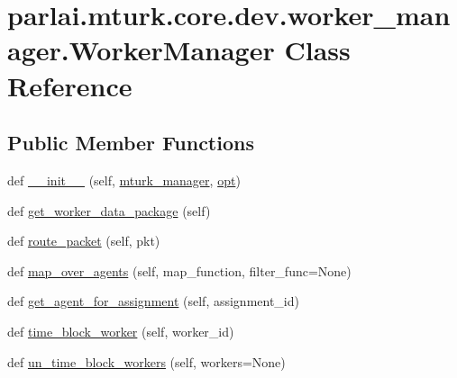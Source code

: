 \hypertarget{classparlai_1_1mturk_1_1core_1_1dev_1_1worker__manager_1_1WorkerManager}{}\section{parlai.\+mturk.\+core.\+dev.\+worker\+\_\+manager.\+Worker\+Manager Class Reference}
\label{classparlai_1_1mturk_1_1core_1_1dev_1_1worker__manager_1_1WorkerManager}
\subsection*{Public Member Functions}
\begin{DoxyCompactItemize}
\item 
def \hyperlink{classparlai_1_1mturk_1_1core_1_1dev_1_1worker__manager_1_1WorkerManager_a491b1e7913bf88ebec78578810cd5bd7}{\+\_\+\+\_\+init\+\_\+\+\_\+} (self, \hyperlink{classparlai_1_1mturk_1_1core_1_1dev_1_1worker__manager_1_1WorkerManager_ac998c8103c199cec59f152128f6b876c}{mturk\+\_\+manager}, \hyperlink{classparlai_1_1mturk_1_1core_1_1dev_1_1worker__manager_1_1WorkerManager_adb7992844dfa581014469721c7b6ebd8}{opt})
\item 
def \hyperlink{classparlai_1_1mturk_1_1core_1_1dev_1_1worker__manager_1_1WorkerManager_a25fea0a63f8cb6ba522162e7e219e945}{get\+\_\+worker\+\_\+data\+\_\+package} (self)
\item 
def \hyperlink{classparlai_1_1mturk_1_1core_1_1dev_1_1worker__manager_1_1WorkerManager_a64541274656cb7cc6890da1625c0bb2b}{route\+\_\+packet} (self, pkt)
\item 
def \hyperlink{classparlai_1_1mturk_1_1core_1_1dev_1_1worker__manager_1_1WorkerManager_ae36a4ae10235fed3001cbc9d1b15b079}{map\+\_\+over\+\_\+agents} (self, map\+\_\+function, filter\+\_\+func=None)
\item 
def \hyperlink{classparlai_1_1mturk_1_1core_1_1dev_1_1worker__manager_1_1WorkerManager_a91cd8f81f6165b8cea229396c185a75d}{get\+\_\+agent\+\_\+for\+\_\+assignment} (self, assignment\+\_\+id)
\item 
def \hyperlink{classparlai_1_1mturk_1_1core_1_1dev_1_1worker__manager_1_1WorkerManager_a030401bc408546feaed72b2dfedd148d}{time\+\_\+block\+\_\+worker} (self, worker\+\_\+id)
\item 
def \hyperlink{classparlai_1_1mturk_1_1core_1_1dev_1_1worker__manager_1_1WorkerManager_a0cd13932ce8ffc3d6d794b4149ff5a42}{un\+\_\+time\+\_\+block\+\_\+workers} (self, workers=None)

\end{DoxyCompactItemize}
